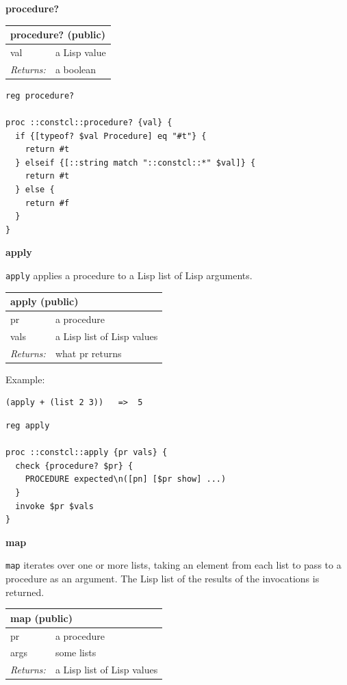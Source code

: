 \documentclass[twoside,9pt]{report}
\begin{document}
\textbf{procedure?}

\begin{tabular}{ |l l| }
\hline
\multicolumn{2}{|l|}{procedure? (public)} \\
\hline
val & a Lisp value \\
\textit{Returns:} & a boolean \\
\hline
\end{tabular}

\noindent\makebox[\linewidth]{\rule{\linewidth}{0.4pt}}
\begin{lstlisting}
reg procedure?
 
proc ::constcl::procedure? {val} {
  if {[typeof? $val Procedure] eq "#t"} {
    return #t
  } elseif {[::string match "::constcl::*" $val]} {
    return #t
  } else {
    return #f
  }
}
\end{lstlisting}
\noindent\makebox[\linewidth]{\rule{\linewidth}{0.4pt}}

\textbf{apply}


\texttt{apply} applies a procedure to a Lisp list of Lisp arguments.

\begin{tabular}{ |l l| }
\hline
\multicolumn{2}{|l|}{apply (public)} \\
\hline
pr & a procedure \\
vals & a Lisp list of Lisp values \\
\textit{Returns:} & what pr returns \\
\hline
\end{tabular}


Example:

\noindent\makebox[\linewidth]{\rule{\linewidth}{0.4pt}}
\begin{lstlisting}
(apply + (list 2 3))   =>  5
\end{lstlisting}
\noindent\makebox[\linewidth]{\rule{\linewidth}{0.4pt}}
\noindent\makebox[\linewidth]{\rule{\linewidth}{0.4pt}}
\begin{lstlisting}
reg apply
 
proc ::constcl::apply {pr vals} {
  check {procedure? $pr} {
    PROCEDURE expected\n([pn] [$pr show] ...)
  }
  invoke $pr $vals
}
\end{lstlisting}
\noindent\makebox[\linewidth]{\rule{\linewidth}{0.4pt}}

\textbf{map}


\texttt{map} iterates over one or more lists, taking an element from each list to pass to a procedure as an argument. The Lisp list of the results of the invocations is returned.

\begin{tabular}{ |l l| }
\hline
\multicolumn{2}{|l|}{map (public)} \\
\hline
pr & a procedure \\
args & some lists \\
\textit{Returns:} & a Lisp list of Lisp values \\
\hline
\end{tabular}
\end{document}
